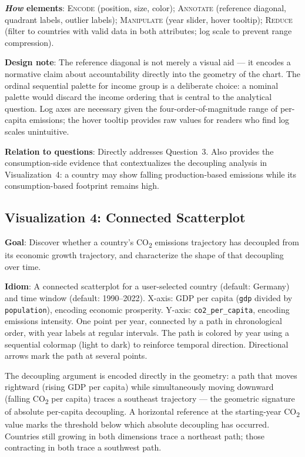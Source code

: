 \documentclass[10pt]{article}
\begin{document}
\textbf{\emph{How} elements}: \textsc{Encode} (position, size, color); \textsc{Annotate} (reference diagonal, quadrant labels, outlier labels); \textsc{Manipulate} (year slider, hover tooltip); \textsc{Reduce} (filter to countries with valid data in both attributes; log scale to prevent range compression).

\textbf{Design note}: The reference diagonal is not merely a visual aid --- it encodes a normative claim about accountability directly into the geometry of the chart. The ordinal sequential palette for income group is a deliberate choice: a nominal palette would discard the income ordering that is central to the analytical question. Log axes are necessary given the four-order-of-magnitude range of per-capita emissions; the hover tooltip provides raw values for readers who find log scales unintuitive.

\textbf{Relation to questions}: Directly addresses Question~3. Also provides the consumption-side evidence that contextualizes the decoupling analysis in Visualization~4: a country may show falling production-based emissions while its consumption-based footprint remains high.

\subsection{Visualization 4: Connected Scatterplot}

\textbf{Goal}: Discover whether a country's CO\textsubscript{2} emissions trajectory has decoupled from its economic growth trajectory, and characterize the shape of that decoupling over time.

\textbf{Idiom}: A connected scatterplot for a user-selected country (default: Germany) and time window (default: 1990--2022). X-axis: GDP per capita (\texttt{gdp} divided by \texttt{population}), encoding economic prosperity. Y-axis: \texttt{co2\_per\_capita}, encoding emissions intensity. One point per year, connected by a path in chronological order, with year labels at regular intervals. The path is colored by year using a sequential colormap (light to dark) to reinforce temporal direction. Directional arrows mark the path at several points.

The decoupling argument is encoded directly in the geometry: a path that moves rightward (rising GDP per capita) while simultaneously moving downward (falling CO\textsubscript{2} per capita) traces a southeast trajectory --- the geometric signature of absolute per-capita decoupling. A horizontal reference at the starting-year CO\textsubscript{2} value marks the threshold below which absolute decoupling has occurred. Countries still growing in both dimensions trace a northeast path; those contracting in both trace a southwest path.
\end{document}
